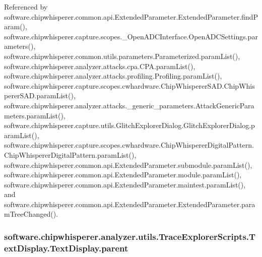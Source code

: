 Referenced by software.\+chipwhisperer.\+common.\+api.\+Extended\+Parameter.\+Extended\+Parameter.\+find\+Param(), software.\+chipwhisperer.\+capture.\+scopes.\+\_\+\+Open\+A\+D\+C\+Interface.\+Open\+A\+D\+C\+Settings.\+parameters(), software.\+chipwhisperer.\+common.\+utils.\+parameters.\+Parameterized.\+param\+List(), software.\+chipwhisperer.\+analyzer.\+attacks.\+cpa.\+C\+P\+A.\+param\+List(), software.\+chipwhisperer.\+analyzer.\+attacks.\+profiling.\+Profiling.\+param\+List(), software.\+chipwhisperer.\+capture.\+scopes.\+cwhardware.\+Chip\+Whisperer\+S\+A\+D.\+Chip\+Whisperer\+S\+A\+D.\+param\+List(), software.\+chipwhisperer.\+analyzer.\+attacks.\+\_\+generic\+\_\+parameters.\+Attack\+Generic\+Parameters.\+param\+List(), software.\+chipwhisperer.\+capture.\+utils.\+Glitch\+Explorer\+Dialog.\+Glitch\+Explorer\+Dialog.\+param\+List(), software.\+chipwhisperer.\+capture.\+scopes.\+cwhardware.\+Chip\+Whisperer\+Digital\+Pattern.\+Chip\+Whisperer\+Digital\+Pattern.\+param\+List(), software.\+chipwhisperer.\+common.\+api.\+Extended\+Parameter.\+submodule.\+param\+List(), software.\+chipwhisperer.\+common.\+api.\+Extended\+Parameter.\+module.\+param\+List(), software.\+chipwhisperer.\+common.\+api.\+Extended\+Parameter.\+maintest.\+param\+List(), and software.\+chipwhisperer.\+common.\+api.\+Extended\+Parameter.\+Extended\+Parameter.\+param\+Tree\+Changed().

\hypertarget{classsoftware_1_1chipwhisperer_1_1analyzer_1_1utils_1_1TraceExplorerScripts_1_1TextDisplay_1_1TextDisplay_a3f9f06adb837b2fb65658332889f7627}{}
\subsubsection[{parent}]{\setlength{\rightskip}{0pt plus 5cm}software.\+chipwhisperer.\+analyzer.\+utils.\+Trace\+Explorer\+Scripts.\+Text\+Display.\+Text\+Display.\+parent}\label{classsoftware_1_1chipwhisperer_1_1analyzer_1_1utils_1_1TraceExplorerScripts_1_1TextDisplay_1_1TextDisplay_a3f9f06adb837b2fb65658332889f7627}


